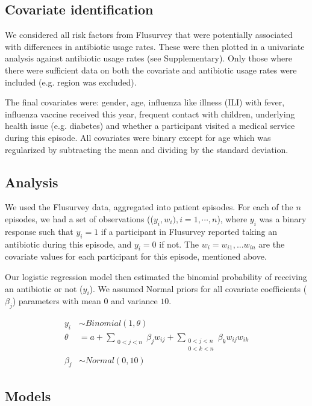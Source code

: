 \documentclass{article}
\begin{document}
\subsection{Covariate identification}

We considered all risk factors from Flusurvey that were potentially associated with differences in antibiotic usage rates. These were then plotted in a univariate analysis against antibiotic usage rates (see Supplementary). Only those where there were sufficient data on both the covariate and antibiotic usage rates were included (e.g. region was excluded).

The final covariates were: gender, age, influenza like illness (ILI) with fever, influenza vaccine received this year, frequent contact with children, underlying health issue (e.g. diabetes) and whether a participant visited a medical service during this episode. All covariates were binary except for age which was regularized by subtracting the mean and dividing by the standard deviation.

\subsection{Analysis}

We used the Flusurvey data, aggregated into patient episodes. For each of the $n$ episodes, we had a set of observations (($y_i, w_i), i = 1, ⋯, n$), where $y_i$ was a binary response such that $y_i = 1$ if a participant in Flusurvey reported taking an antibiotic during this episode, and $y_i = 0$ if not. The $w_i = w_{i1}, ... w_{in}$ are the covariate values for each participant for this episode, mentioned above. 

Our logistic regression model then estimated the binomial probability of receiving an antibiotic or not ($y_i$). We assumed Normal priors for all covariate coefficients ($\beta_j$) parameters with mean $0$ and variance $10$. 

\begin{align}
y_i &\sim Binomial(1, \theta) \\
\theta &= a + \sum_{\substack{0<j<n}} \beta_j w_{ij} 
+ \sum_{\substack{0<j<n \\ 0<k<n}} \beta_k w_{ij} w_{ik} \\
\beta_{j} &\sim Normal(0,10)
\end{align}


\subsection{Models}
\end{document}
